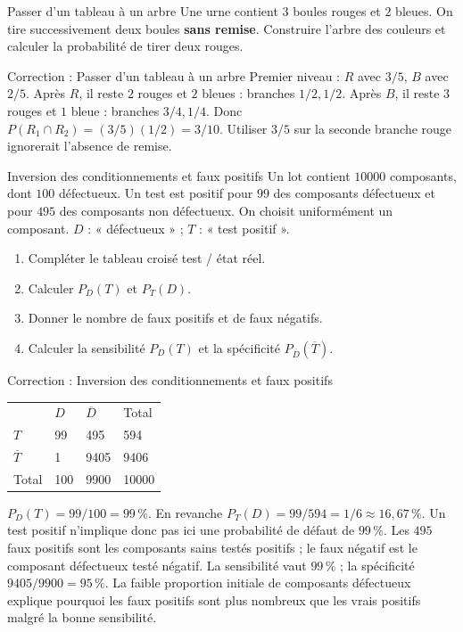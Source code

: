 \documentclass[aspectratio=169,10pt]{beamer}
\begin{document}
\begin{frame}{Passer d'un tableau à un arbre}
Une urne contient \(3\) boules rouges et \(2\) bleues. On tire successivement deux boules \textbf{sans remise}. Construire l'arbre des couleurs et calculer la probabilité de tirer deux rouges.
\end{frame}
\begin{frame}{Correction : Passer d'un tableau à un arbre}
Premier niveau : \(R\) avec \(3/5\), \(B\) avec \(2/5\). Après \(R\), il reste \(2\) rouges et \(2\) bleues : branches \(1/2,1/2\). Après \(B\), il reste \(3\) rouges et \(1\) bleue : branches \(3/4,1/4\). Donc \(P(R_1\cap R_2)=(3/5)(1/2)=3/10\). Utiliser \(3/5\) sur la seconde branche rouge ignorerait l'absence de remise.
\end{frame}
\begin{frame}{Inversion des conditionnements et faux positifs}
Un lot contient \(10000\) composants, dont \(100\) défectueux. Un test est positif pour \(99\) des composants défectueux et pour \(495\) des composants non défectueux. On choisit uniformément un composant. \(D\) : « défectueux » ; \(T\) : « test positif ».

\begin{enumerate}
\setcounter{enumi}{0}\item Compléter le tableau croisé test / état réel.
\item Calculer \(P_D(T)\) et \(P_T(D)\).
\item Donner le nombre de faux positifs et de faux négatifs.
\item Calculer la sensibilité \(P_D(T)\) et la spécificité \(P_{\overline D}(\overline T)\).

\end{enumerate}
\end{frame}
\begin{frame}{Correction : Inversion des conditionnements et faux positifs}
\begin{center}\begin{tabular}{llll}
 & \(D\) & \(\overline D\) & Total \\ 
\(T\) & 99 & 495 & 594 \\ 
\(\overline T\) & 1 & 9405 & 9406 \\ 
Total & 100 & 9900 & 10000 \\ 
\end{tabular}\end{center} 
\(P_D(T)=99/100=99\,\%\). En revanche \(P_T(D)=99/594=1/6\approx16{,}67\,\%\). Un test positif n'implique donc pas ici une probabilité de défaut de \(99\,\%\).
Les \(495\) faux positifs sont les composants sains testés positifs ; le faux négatif est le composant défectueux testé négatif. La sensibilité vaut \(99\,\%\) ; la spécificité \(9405/9900=95\,\%\).
La faible proportion initiale de composants défectueux explique pourquoi les faux positifs sont plus nombreux que les vrais positifs malgré la bonne sensibilité.
\end{frame}
\end{document}
